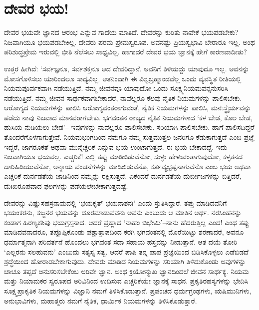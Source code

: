 \section*{ದೇವರ ಭಯ!}


ದೇವರ ಭಯವೇ ಜ್ಞಾನದ ಆರಂಭ ಎನ್ನುವ ಗಾದೆಯ ಮಾತಿದೆ. ದೇವರನ್ನು ಕುರಿತು ನಾವೇಕೆ ಭಯಪಡಬೇಕು? ನಿಜವಾಗಿಯೂ ಭಯಪಡಬೇಕಿಲ್ಲ. ದೇವರು ಪರಮ ಪ್ರೇಮಸ್ವರೂಪ. ಅವನಷ್ಟು ಪ್ರಿಯಸ್ವಭಾವಿ ಬೇರಾರೂ ಇಲ್ಲ. ಅಂಥ ಪರಿಶುದ್ಧಪ್ರೇಮ ಇರುವಲ್ಲಿ ಭೀತಿ ನೆಲೆಸಲು ಸಾಧ್ಯವಿಲ್ಲ. ಹಾಗಾದರೆ ದೇವರ ಭಯ ಜ್ಞಾನಕ್ಕೆ ಹೇಗೆ ಕಾರಣವಾದೀತು?

ಉತ್ತರ ಹೀಗಿದೆ: ‘ಸರ್ವಜ್ಞನೂ, ಸರ್ವಶಕ್ತನೂ ಆದ ದೇವರಿದ್ದಾನೆ. ಅವನಿಗೆ ತಿಳಿಯದ್ದು ಯಾವುದೂ ಇಲ್ಲ. ಅವನನ್ನು ಮೋಸಗೊಳಿಸಲು ಯಾರಿಂದಲೂ ಸಾಧ್ಯವಿಲ್ಲ. ಆತನಿಂದಾಗಿ ಈ ವಿಶ್ವಬ್ರಹ್ಮಾಂಡವೆಲ್ಲ ಒಂದು ವ್ಯವಸ್ಥಿತ ರೀತಿಯಲ್ಲಿ ನಿಯಮಪೂರ್ವಕವಾಗಿ ನಡೆಯುತ್ತಿದೆ. ನಮ್ಮ ಜೀವನವೂ ಯಾವುದೋ ಒಂದು ಸೂಕ್ಷ್ಮನಿಯಮವನ್ನನುಸರಿಸಿ ನಡೆಯುತ್ತಿದೆ. ನಮ್ಮ ಜೀವನ ಸಾರ್ಥಕವಾಗಬೇಕಾದರೆ, ನಾವೆಲ್ಲರೂ ಕೆಲವು ನೈತಿಕ ನಿಯಮಗಳನ್ನು ಪಾಲಿಸಬೇಕು. ಆರೋಗ್ಯದ ನಿಯಮಗಳನ್ನು ಪಾಲಿಸಿ ಆರೋಗ್ಯವಂತರಾಗುವಂತೆ, ನೈತಿಕ ನಿಯಮಗಳನ್ನು ಪಾಲಿಸಿ, ಮನಃಸ್ಥೈರ್ಯವನ್ನು ಪಡೆದು ನಾವು ನಿಜವಾದ ಮಾನವರಾಗಬೇಕು. ಭಗವಂತನ ರಾಜ್ಯದ ನೈತಿಕ ನಿಯಮಗಳಾದ ‘ಕಳ ಬೇಡ, ಕೊಲ ಬೇಡ, ಹುಸಿಯ ನುಡಿಯಲು ಬೇಡ’– ಇವುಗಳನ್ನು ನಾವೆಲ್ಲರೂ ಪಾಲಿಸಬೇಕು. ಸರಿಯಾಗಿ ಪಾಲಿಸಬೇಕು. ಹಾಗೆ ಪಾಲಿಸದಿದ್ದರೆ ತೊಂದರೆಗೊಳಗಾಗುತ್ತೇವೆ. ನಿಯಮಭಂಗದಿಂದ ನಮಗೂ ನಮ್ಮ ಸುತ್ತಮುತ್ತಲ ಜನರಿಗೂ ಕೆಡುಕಾಗುತ್ತದೆ ಎಂಬ ಪ್ರಜ್ಞೆ ಇದ್ದರೆ, ಜಾಗರೂಕತೆ ಅಥವಾ ಮುನ್ನೆಚ್ಚರಿಕೆ ಎನ್ನುವ ಭಯ ಉಂಟಾಗುತ್ತದೆ. ಈ ಭಯ ಬೇಕಾದದ್ದೆ. ಇದು ನಿಜವಾಗಿಯೂ ಭಯವಲ್ಲ. ಎಚ್ಚರಿಕೆ! ಎಲ್ಲಿ ತಪ್ಪು ಮಾಡಿಬಿಡುವೆನೋ, ಸುಳ್ಳು ಹೇಳುವಂತಾಗುವುದೋ, ಕಳ್ಳತನದ ದಾರಿಹಿಡಿಯುವೆನೋ, ಅನ್ಯಾಯ ವಂಚನೆಗಳನ್ನು ಮಾಡಿಬಿಡುವೆನೊ, ಕರ್ತವ್ಯಭ್ರಷ್ಟನಾಗುವೆನೊ ಎಂಬ ಭಯ ಅಥವಾ ಎಚ್ಚರಿಕೆ ದುರ್ನಡತೆಯ ಜಾಡಿನಿಂದ ನಮ್ಮನ್ನು ರಕ್ಷಿಸುತ್ತದೆ. ಏಕೆಂದರೆ ದುರ್ನಡತೆಯ ದುರ್ಬೀಜಗಳನ್ನು ಬಿತ್ತಿದರೆ, ದುಃಖರೂಪವಾದ ಫಲಗಳನ್ನು ಪಡೆಯಲೇಬೇಕಾಗುತ್ತದಷ್ಟೆ.

\newpage

ದೇವರನ್ನು ವಿಷ್ಣುಸಹಸ್ರನಾಮದಲ್ಲಿ ‘ಭಯಕೃತ್ ಭಯನಾಶನಃ’ ಎಂದು ಸ್ತುತಿಸಿದ್ದಾರೆ. ತಪ್ಪು ಮಾಡಿದವನಿಗೆ ಭಯಂಕರನು, ಸಜ್ಜನರ ಭಯವನ್ನು ದೂರಮಾಡುವವನು ಅವನು ಎಂಬುದು ಆ ಮಾತಿನ ಅರ್ಥ. ನರಸಿಂಹನನ್ನು ಕಂಡಾಗ ಹಿರಣ್ಯಕಶಿಪು ಭಯಗ್ರಸ್ತನಾದ. ಆದರೆ ಪ್ರಹ್ಲಾದ ‘ನಾಹಂ ಬಿಭೇಮಿ’–ನಾನು ಹೆದರುತ್ತಿಲ್ಲ ಎಂದ! ಎಂಥ ತಪ್ಪು ಮಾಡಿದವನಾದರೂ, ತಪ್ಪೊಪ್ಪಿಕೊಂಡು ಪಶ್ಚಾತ್ತಾಪದಿಂದ ಕರಗಿ ಭಗವಂತನಲ್ಲಿ ಮೊರೆಯಿಟ್ಟು ಶರಣಾದರೆ, ಅವನೂ ಧರ್ಮಾತ್ಮನಾಗಿ ಪರಿವರ್ತನೆ ಹೊಂದಲು ಭಗವಂತ ಸದಾ ಸಹಾಯ ಹಸ್ತವನ್ನು ನೀಡುತ್ತಾನೆ. ಆತ ದಯೆ ತೋರಿ ‘ಎಲ್ಲರನು ಸಲಹುವನು’ ಎಂಬುದು ಸತ್ಯಸ್ಯ ಸತ್ಯ. ಆದರೆ ಪಾಪಿ ತನ್ನ ಪಾಪ ಪ್ರಜ್ಞೆಯಿಂದ ಬಿಡಿಸಿಕೊಳ್ಳಲು ಎಡೆಬಿಡದೆ ಶ್ರದ್ಧೆಯಿಂದ ಹೋರಾಡಬೇಕಾಗುವುದು. ದೇವರು ಮಾಡಿದ ನಿಯಮಗಳನ್ನು ಸರಿಯಾಗಿ ತಿಳಿದುಕೊಂಡು ಅವುಗಳನ್ನು ಚಾಚೂ ತಪ್ಪದೆ ಅನುಸರಿಸಬೇಕೆಂಬ ಅರಿವೇ ಜ್ಞಾನ. ಅಂಥ ಕ್ರಿಯೋನ್ಮುಖ ಜ್ಞಾನದಿಂದಲೆ ಜೀವನ ಸಾರ್ಥಕ್ಯ. ನಿಯಮ ಮತ್ತು ನಿಯಾಮಕರ ಸ್ವರೂಪದ ಅರಿವಿನಿಂದ ಉದಿಸುವ ಎಚ್ಚರಿಕೆಯೇ ಜ್ಞಾನಕ್ಕೆ ಸಾಧನ. ಪ್ರಕೃತಿರಹಸ್ಯಗಳನ್ನು ಭೇದಿಸಿ ಸೂಕ್ಷ್ಮಪ್ರಾಕೃತಿಕ ನಿಯಮಗಳನ್ನು ವಿಜ್ಞಾನಿ ನಮಗೆ ತಿಳಿಸಿಕೊಡುತ್ತಾನೆ. ಪ್ರಪಂಚದ ಧರ್ಮಗ್ರಂಥಗಳು, ಋಷಿಮುನಿಗಳು, ಅನುಭಾವಿಗಳು, ಮಹಾತ್ಮರು ನಮಗೆ ನೈತಿಕ, ಧಾರ್ಮಿಕ ನಿಯಮಗಳನ್ನು ತಿಳಿಸಿಕೊಡುತ್ತಾರೆ.

